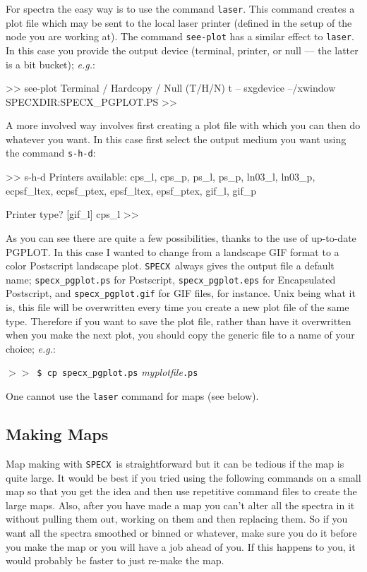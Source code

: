 \documentclass[11pt,twoside]{starlink}
\providecommand{\eg}{\textit{e.g.}}
\providecommand{\SPECX}{\texttt{SPECX}}
\providecommand{\SP}{{$>\!>$}}
\begin{document}
For spectra the easy way is to use the command \texttt{laser}.  This command
creates
a plot file which may be sent to the local laser printer (defined in the
setup of the node you are working at).  The command \texttt{see-plot} has
a similar effect to \texttt{laser}. In this case you provide the output
device (terminal, printer, or null --- the latter is a bit bucket);
\eg :

\begin{terminalv}
 >> see-plot
 Terminal / Hardcopy / Null (T/H/N) t
 -- sxgdevice --/xwindow         SPECXDIR:SPECX_PGPLOT.PS
 >>
\end{terminalv}

A more involved way involves first creating a plot file with which you
can then do whatever you want. In this case first select the output
medium you want using the command \texttt{s-h-d}:

\begin{terminalv}
 >> s-h-d
 Printers available:
 cps_l,            cps_p,            ps_l,             ps_p,
 ln03_l,           ln03_p,           ecpsf_ltex,       ecpsf_ptex,
 epsf_ltex,        epsf_ptex,        gif_l,            gif_p

 Printer type? [gif_l] cps_l
 >>
\end{terminalv}

As you can see there are quite a few possibilities, thanks to the use
of up-to-date PGPLOT. In this case I wanted to change from a landscape
GIF format to a color Postscript landscape plot. \SPECX\ always gives
the output file a default name; \verb|specx_pgplot.ps| for Postscript,
\verb|specx_pgplot.eps| for Encapsulated Postscript,
and \verb|specx_pgplot.gif| for GIF files, for instance. Unix being
what it is, this file will be overwritten every time you create a new
plot file of the same type.  Therefore if you want to save the plot
file, rather than have it overwritten when you make the next plot, you
should copy the generic file to a name of your choice; \eg :

\SP\ \verb|$ cp specx_pgplot.ps| \textit{myplotfile}\texttt{.ps}


One cannot use the \texttt{laser} command for maps (see below).

\subsection{Making Maps}
\label{sec:specx_13}
Map making with \SPECX\ is straightforward but it can be tedious if
the map is quite large.  It would be best if you tried using the
following commands on a small map so that you get the idea and then
use repetitive command files to create the large maps.  Also, after
you have made a map you can't alter all the spectra in it without
pulling them out, working on them and then replacing them.  So if you
want all the spectra smoothed or binned or whatever, make sure you do
it before you make the map or you will have a job ahead of you. If
this happens to you, it would probably be faster to just re-make the
map.
\end{document}

